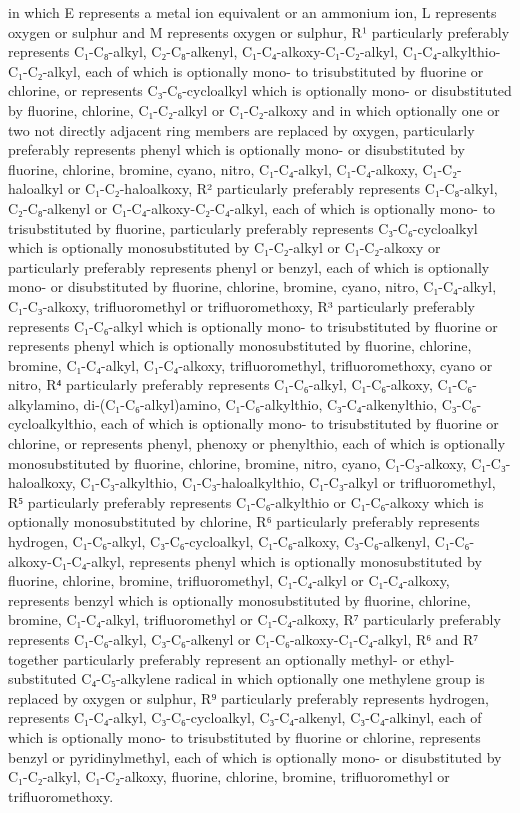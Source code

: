\documentclass[11pt,a4paper]{article}
\begin{document}
in which E represents a metal ion equivalent or an ammonium ion, L represents oxygen or sulphur and M represents oxygen or sulphur, R¹ particularly preferably represents C₁-C₈-alkyl, C₂-C₈-alkenyl, C₁-C₄-alkoxy-C₁-C₂-alkyl, C₁-C₄-alkylthio-C₁-C₂-alkyl, each of which is optionally mono- to trisubstituted by fluorine or chlorine, or represents C₃-C₆-cycloalkyl which is optionally mono- or disubstituted by fluorine, chlorine, C₁-C₂-alkyl or C₁-C₂-alkoxy and in which optionally one or two not directly adjacent ring members are replaced by oxygen, particularly preferably represents phenyl which is optionally mono- or disubstituted by fluorine, chlorine, bromine, cyano, nitro, C₁-C₄-alkyl, C₁-C₄-alkoxy, C₁-C₂-haloalkyl or C₁-C₂-haloalkoxy, R² particularly preferably represents C₁-C₈-alkyl, C₂-C₈-alkenyl or C₁-C₄-alkoxy-C₂-C₄-alkyl, each of which is optionally mono- to trisubstituted by fluorine, particularly preferably represents C₃-C₆-cycloalkyl which is optionally monosubstituted by C₁-C₂-alkyl or C₁-C₂-alkoxy or particularly preferably represents phenyl or benzyl, each of which is optionally mono- or disubstituted by fluorine, chlorine, bromine, cyano, nitro, C₁-C₄-alkyl, C₁-C₃-alkoxy, trifluoromethyl or trifluoromethoxy, R³ particularly preferably represents C₁-C₆-alkyl which is optionally mono- to trisubstituted by fluorine or represents phenyl which is optionally monosubstituted by fluorine, chlorine, bromine, C₁-C₄-alkyl, C₁-C₄-alkoxy, trifluoromethyl, trifluoromethoxy, cyano or nitro, R⁴ particularly preferably represents C₁-C₆-alkyl, C₁-C₆-alkoxy, C₁-C₆-alkylamino, di-(C₁-C₆-alkyl)amino, C₁-C₆-alkylthio, C₃-C₄-alkenylthio, C₃-C₆-cycloalkylthio, each of which is optionally mono- to trisubstituted by fluorine or chlorine, or represents phenyl, phenoxy or phenylthio, each of which is optionally monosubstituted by fluorine, chlorine, bromine, nitro, cyano, C₁-C₃-alkoxy, C₁-C₃-haloalkoxy, C₁-C₃-alkylthio, C₁-C₃-haloalkylthio, C₁-C₃-alkyl or trifluoromethyl, R⁵ particularly preferably represents C₁-C₆-alkylthio or C₁-C₆-alkoxy which is optionally monosubstituted by chlorine, R⁶ particularly preferably represents hydrogen, C₁-C₆-alkyl, C₃-C₆-cycloalkyl, C₁-C₆-alkoxy, C₃-C₆-alkenyl, C₁-C₆-alkoxy-C₁-C₄-alkyl, represents phenyl which is optionally monosubstituted by fluorine, chlorine, bromine, trifluoromethyl, C₁-C₄-alkyl or C₁-C₄-alkoxy, represents benzyl which is optionally monosubstituted by fluorine, chlorine, bromine, C₁-C₄-alkyl, trifluoromethyl or C₁-C₄-alkoxy, R⁷ particularly preferably represents C₁-C₆-alkyl, C₃-C₆-alkenyl or C₁-C₆-alkoxy-C₁-C₄-alkyl, R⁶ and R⁷ together particularly preferably represent an optionally methyl- or ethyl-substituted C₄-C₅-alkylene radical in which optionally one methylene group is replaced by oxygen or sulphur, R⁹ particularly preferably represents hydrogen, represents C₁-C₄-alkyl, C₃-C₆-cycloalkyl, C₃-C₄-alkenyl, C₃-C₄-alkinyl, each of which is optionally mono- to trisubstituted by fluorine or chlorine, represents benzyl or pyridinylmethyl, each of which is optionally mono- or disubstituted by C₁-C₂-alkyl, C₁-C₂-alkoxy, fluorine, chlorine, bromine, trifluoromethyl or trifluoromethoxy.
\end{document}
